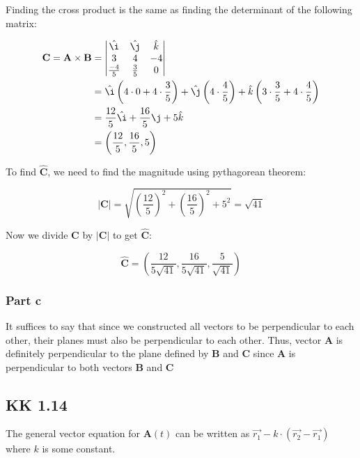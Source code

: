 \documentclass{article}
\theoremstyle{definition}
\numberwithin{equation}{section}
\numberwithin{definition}{section}
\begin{document}
Finding the cross product is the same as finding the determinant of the following matrix:

 \begin{align*}
\mathbf{C} = 	\mathbf{A} \times \mathbf{B} &= \begin{vmatrix}
	\hat \i & \hat \j & \hat k \\
	3 & 4 & -4 \\
	\frac{-4}{5} & \frac{3}{5} & 0 
\end{vmatrix}\\
&= \hat \i\left(4\cdot 0 + 4\cdot \frac{3}{5}\right)+ \hat \j \left(4 \cdot \frac{4}{5}\right) + \hat k \left(3 \cdot \frac{3}{5} + 4 \cdot \frac{4}{5}\right)\\
&= \frac{12}{5} \hat \i + \frac{16}{5} \j + 5 \hat k\\
&= \left(\frac{12}{5}, \frac{16}{5}, 5 \right)
\end{align*}

To find $\hat{\mathbf{C}}$, we need to find the magnitude using pythagorean theorem: 

\[ |\mathbf{C}| = \sqrt{\left(\frac{12}{5}\right)^2  + \left(\frac{16}{5}\right)^2 + 5^2} = \sqrt{41}\]


Now we divide $\mathbf{C}$ by $|\mathbf{C}|$ to get $\hat{\mathbf{C}}$:

\[ \hat{\mathbf{C}} = \left( \frac{12}{5\sqrt{41}}, \frac{16}{5\sqrt{41}}, \frac{5}{\sqrt{41}} \right)\]



\subsubsection{Part c}

It suffices to say that since we constructed all vectors to be perpendicular to each other, their planes must also be perpendicular to each other. Thus, vector $\mathbf{A}$ is definitely perpendicular to the plane defined by $\mathbf{B}$ and $\mathbf{C}$ since $\mathbf{A}$ is perpendicular to both vectors $\mathbf{B}$ and $\mathbf{C}$


\subsection{KK 1.14}

The general vector equation for $\mathbf{A}(t)$ can be written as $\vec{r_1} - k \cdot(\vec{r_2}-\vec{r_1})$ where $k$ is some constant. 

\medskip
\end{document}
